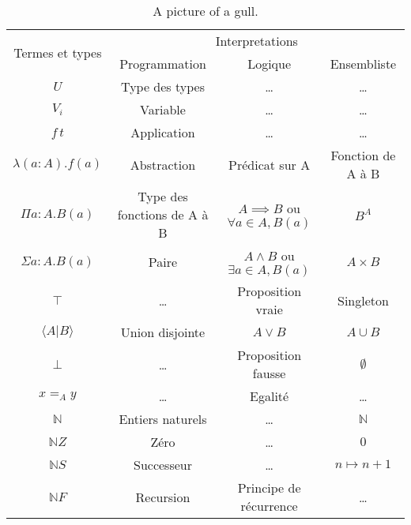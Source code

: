 \documentclass[12pt, a4paper]{article}
\begin{document}
\small\begin{table}[h!]\begin{center}\begin{tabular}{ | c | c | c | c | }
\hline
\multirow{2}{*}{Termes et types} & \multicolumn{3}{c|}{Interpretations} \\
\cline{2-4}
                        & Programmation                    & Logique                                    & Ensembliste        \\
\hline
$U$                     & Type des types\footnotemark[1]   & \dots                                      & \dots              \\
$V_i$                   & Variable                         & \dots                                      & \dots              \\
$f\,t$                  & Application                      & \dots                                      & \dots              \\
\hline   
$\lambda (a : A). f(a)$ & Abstraction                      & Prédicat sur A                             & Fonction de A à B  \\
$\Pi{a : A}. B(a)$      & Type des fonctions de A à B      & $A \implies B$ ou $\forall a \in A, B(a)$  & $B^A$              \\
\hline   
$\Sigma{a : A}. B(a)$   & Paire                            & $A \wedge B$ ou $\exists a \in A, B(a)$    & $A \times B$       \\
$\top$                  & \dots                            & Proposition vraie                          & Singleton          \\
\hline   
$\langle A | B \rangle$ & Union disjointe                  & $A \vee B$                                 & $A \cup B$         \\
$\bot$                  & \dots                            & Proposition fausse                         & $\emptyset$        \\
\hline   
$x =_A y$               & \dots                            & Egalité                                    & \dots              \\
\hline   
$\mathbb{N}$            & Entiers naturels\footnotemark[2] & \dots                                      & $\mathbb{N}$       \\
$\mathbb{N}Z$           & Zéro                             & \dots                                      & $0$                \\
$\mathbb{N}S$           & Successeur                       & \dots                                      & $n \mapsto n+1$    \\
$\mathbb{N}F$           & Recursion                        & Principe de récurrence                     & \dots              \\
\hline
\end{tabular}\end{center}\caption{A picture of a gull.}\end{table}
\end{document}
